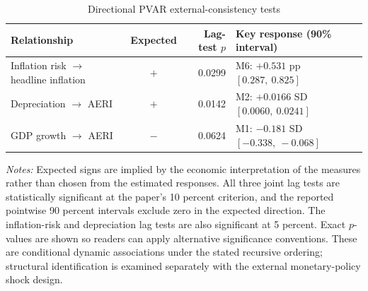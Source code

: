 \begin{table}[htbp]\centering\small\singlespacing
\caption{Directional PVAR external-consistency tests}\label{tab:selected_external_consistency}
\setlength{\tabcolsep}{4pt}
\begin{tabular}{@{}p{4.25cm}crp{6.0cm}@{}}\toprule
Relationship & Expected & Lag-test $p$ & Key response (90\% interval)\\\midrule
Inflation risk $\rightarrow$ headline inflation & $+$ & 0.0299 & M6: $+0.531$ pp $[0.287,\ 0.825]$\\
Depreciation $\rightarrow$ AERI & $+$ & 0.0142 & M2: $+0.0166$ SD $[0.0060,\ 0.0241]$\\
GDP growth $\rightarrow$ AERI & $-$ & 0.0624 & M1: $-0.181$ SD $[-0.338,\ -0.068]$\\
\bottomrule\end{tabular}
\par\medskip\raggedright\footnotesize\textit{Notes:} Expected signs are implied by the economic interpretation of the measures rather than chosen from the estimated responses. All three joint lag tests are statistically significant at the paper's 10 percent criterion, and the reported pointwise 90 percent intervals exclude zero in the expected direction. The inflation-risk and depreciation lag tests are also significant at 5 percent. Exact $p$-values are shown so readers can apply alternative significance conventions. These are conditional dynamic associations under the stated recursive ordering; structural identification is examined separately with the external monetary-policy shock design.
\end{table}

